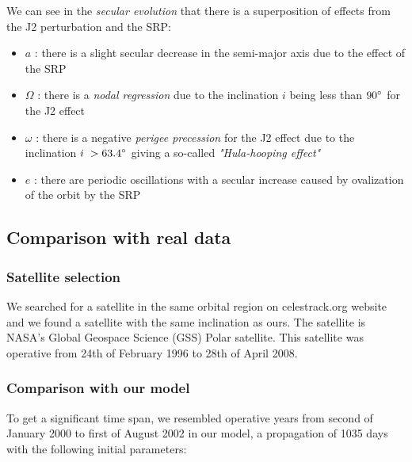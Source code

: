 \documentclass[11pt,a4paper]{report}
\begin{document}
\par We can see in the \emph{secular evolution} that there is a superposition of effects from the J2 perturbation and the SRP:
\begin{itemize}
    \item \emph{$a$} : there is a slight secular decrease in the semi-major axis due to the effect of the SRP 
    \item \emph{$\Omega$} : there is a \emph{nodal regression} due to the inclination $i$ being less than $90\degree$ for the J2 effect
    \item  \emph{$\omega$} : there is a negative \emph{perigee precession} for the J2 effect due to the inclination $i\;> 63.4\degree$ giving a so-called \emph{"Hula-hooping effect"}
    \item \emph{$e$} : there are periodic oscillations with a secular increase caused by ovalization of the orbit by the SRP
\end{itemize}

\subsection{Comparison with real data}

\subsubsection{Satellite selection}
We searched for a satellite in the same orbital region on celestrack.org website and we found a satellite with the same inclination as ours. 
The satellite is NASA’s Global Geospace Science (GSS) Polar satellite.
This satellite was operative from 24th of February 1996 to 28th of April 2008.

\subsubsection{Comparison with our model}
To get a significant time span, we resembled operative years from second of January 2000 to first of August 2002 in our model, a propagation of 1035 days with the following initial parameters\cite{POLAR}:

\begin{table}[H]
\centering
{}
\end{table}
\end{document}
